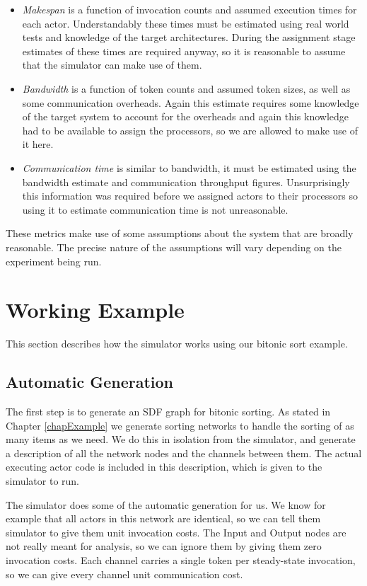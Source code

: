 \begin{itemize}
	\item {\em Makespan} is a function of invocation counts and assumed execution times for each actor.
			Understandably these times must be estimated using real world tests and knowledge of the target architectures.
			During the assignment stage estimates of these times are required anyway, so it is reasonable to assume that the simulator can make use of them.
	\item {\em Bandwidth} is a function of token counts and assumed token sizes, as well as some communication overheads.
			Again this estimate requires some knowledge of the target system to account for the overheads and again this knowledge had to be available to assign the processors, so we are allowed to make use of it here.
	\item {\em Communication time} is similar to bandwidth, it must be estimated using the bandwidth estimate and communication throughput figures.
			Unsurprisingly this information was required before we assigned actors to their processors so using it to estimate communication time is not unreasonable.
\end{itemize}

\noindent
These metrics make use of some assumptions about the system that are broadly reasonable.
The precise nature of the assumptions will vary depending on the experiment being run.

\section{Working Example}

This section describes how the simulator works using our bitonic sort example.

\subsection{Automatic Generation}

The first step is to generate an SDF graph for bitonic sorting.
As stated in Chapter \ref{chapExample} we generate sorting networks to handle the sorting of as many items as we need.
We do this in isolation from the simulator, and generate a description of all the network nodes and the channels between them.
The actual executing actor code is included in this description, which is given to the simulator to run.

The simulator does some of the automatic generation for us.
We know for example that all actors in this network are identical, so we can tell them simulator to give them unit invocation costs.
The Input and Output nodes are not really meant for analysis, so we can ignore them by giving them zero invocation costs.
Each channel carries a single token per steady-state invocation, so we can give every channel unit communication cost.

